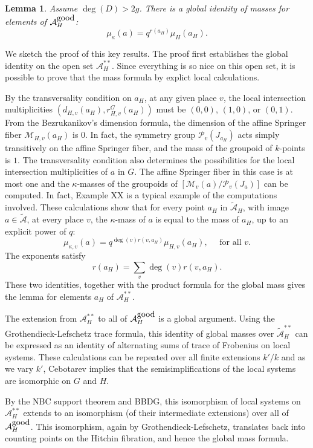 \documentclass[brochure,english,12pt]{bourbaki}
\newtheorem{lemma}[equation]{Lemma}
\def\A{{\mathcal A}}
\def\M{{\mathcal M}}
\def\P{{\mathcal P}}
\def\tA{{\tilde{\mathcal A}}}
\begin{document}
\begin{lemma}
Assume $\deg(D)>2g$.  There is a global identity of masses for elements of $\A_H^{\hbox{good}}$:
\[
\mu_\kappa(a) = q^{r(a_H)} \mu_H(a_H).
\]
\end{lemma}

We sketch the proof of this key results.
The proof first establishes the global identity on the open set $\A_H^{**}$.
Since everything is so nice on this open set, 
it is possible to prove that the mass formula by explict local calculations. 

By the transversality
condition on $a_H$, at any given place $v$, the local intersection
multiplicities $(d_{H,v}(a_H),r^G_{H,v}(a_H))$ must be $(0,0)$,
$(1,0)$, or $(0,1)$.  From the Bezrukanikov's dimension formula, the
dimension of the affine Springer fiber $\M_{H,v}(a_H)$ is $0$.  In
fact, the symmetry group $\P_v(J_{a_H})$ acts simply transitively on
the affine Springer fiber, and the mass of the groupoid of $k$-points
is $1$.  The transversality condition also determines the
possibilities for the local intersection multiplicities of $a$ in $G$.
The affine Springer fiber in this case is at most one and the
$\kappa$-masses of the groupoids of $[\M_v(a)/\P_v(J_a)]$ can be
computed.  In fact, Example XX is a typical example of the
computations involved.  These calculations show that for every point
$a_H$ in $\tA_H$, with image $a\in \tA$, at every place $v$, the
$\kappa$-mass of $a$ is equal to the mass of $a_H$, up to an explicit
power of $q$:
\[
\mu_{\kappa ,v}(a) = q^{\deg(v) r(v,a_H)} \mu_{H,v} (a_H), \quad \text{ for all } v.
\]
The exponents satisfy
\[
r(a_H) = \sum_v \deg(v) r(v,a_H).
\]
These two identities, together with the product formula for the global mass gives
the lemma for elements $a_H$ of $\A_H^{**}$.  

The extension from $\A_H^{**}$ to all of $\A_H^{\hbox{good}}$ is a
global argument.  Using the Grothendieck-Lefschetz trace formula, this
identity of global masses over $\tA_H^{**}$ can be expressed as an identity of alternating sums
of trace of Frobenius on local systems.  These calculations can be
repeated over all finite extensions $k'/k$ and as we vary $k'$,
Cebotarev implies that the semisimplifications of the local systems
are isomorphic on $G$ and $H$.

By the NBC support theorem and BBDG, this isomorphism of local systems
on $\A_H^{**}$ extends to an isomorphism (of their intermediate
extensions) over all of $\A_H^{\hbox{good}}$.  This isomorphism, again by Grothendieck-Lefschetz, translates
back into counting points on the Hitchin
fibration, and hence the global mass formula.
\end{document}
